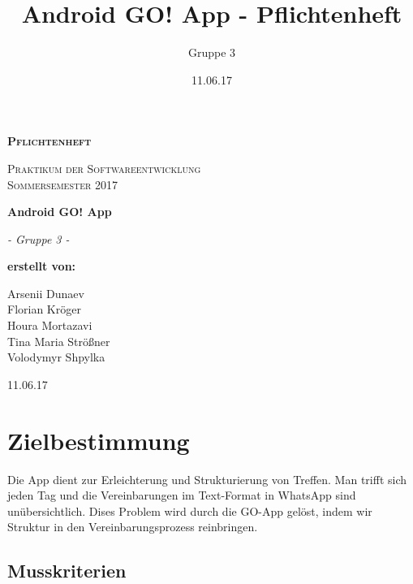 \documentclass[parskip=full]{scrartcl}
\title{Android GO! App - Pflichtenheft}
\author{Gruppe 3}
\date{11.06.17}
\begin{document}
\begin{titlepage}
	\begin{center}
	{\scshape\LARGE \bfseries Pflichtenheft \par}
	\vspace{1cm}
	{\scshape\Large Praktikum der Softwareentwicklung \\ Sommersemester 2017\par}
	\vspace{1.5cm}
	{\huge\bfseries Android GO! App\par}
	\vspace{2cm}
	{\Large\itshape - Gruppe 3 -\par}
	\vfill
	{\bfseries erstellt von:\par}
	Arsenii Dunaev \\
	Florian Kröger \\
	Houra Mortazavi \\ %
	Tina Maria Strößner \\
	Volodymyr Shpylka \\	
	\vfill
	{\large 11.06.17 \par}	
	\end{center}
\end{titlepage}

\tableofcontents

\newpage
\section{Zielbestimmung}
Die App dient zur Erleichterung und Strukturierung von Treffen. 
Man trifft sich jeden Tag und die Vereinbarungen im Text-Format in WhatsApp sind unübersichtlich. 
Dises Problem wird durch die GO-App gelöst, indem wir Struktur in den Vereinbarungsprozess reinbringen.  
\subsection{Musskriterien}
\end{document}
